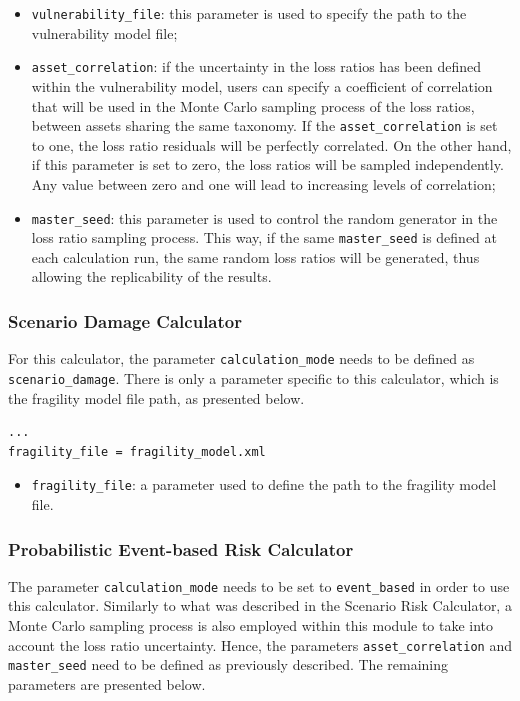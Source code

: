 \begin{itemize}
\item  \Verb+vulnerability_file+: this parameter is used to specify the path to the vulnerability model file;
\item  \Verb+asset_correlation+: if the uncertainty in the loss ratios has been defined within the vulnerability model, users can specify a coefficient of correlation that will be used in the Monte Carlo sampling process of the loss ratios, between assets sharing the same taxonomy. If the \Verb+asset_correlation+ is set to one, the loss ratio residuals will be perfectly correlated. On the other hand, if this parameter is set to zero, the loss ratios will be sampled independently. Any value between zero and one will lead to increasing levels of correlation;
\item  \Verb+master_seed+: this parameter is used to control the random generator in the loss ratio sampling process. This way, if the same \Verb+master_seed+ is defined at each calculation run, the same random loss ratios will be generated, thus allowing the replicability of the results.
\end{itemize}

\subsubsection{Scenario Damage Calculator}
For this calculator, the parameter \Verb+calculation_mode+ needs to be defined as \Verb+scenario_damage+. There is only a parameter specific to this calculator, which is the fragility model file path, as presented below.

\begin{Verbatim}[frame=single, commandchars=\\\{\}, samepage=true]
...
fragility_file = fragility_model.xml
\end{Verbatim}

\begin{itemize}
\item  \Verb+fragility_file+: a parameter used to define the path to the fragility model file.
\end{itemize}

\subsubsection{Probabilistic Event-based Risk Calculator}
The parameter \Verb+calculation_mode+ needs to be set to \Verb+event_based+ in order to use this calculator. Similarly to what was described in the Scenario Risk Calculator, a Monte Carlo sampling process is also employed within this module to take into account the loss ratio uncertainty. Hence, the parameters \Verb+asset_correlation+ and \Verb+master_seed+ need to be defined as previously described. The remaining parameters are presented below.

